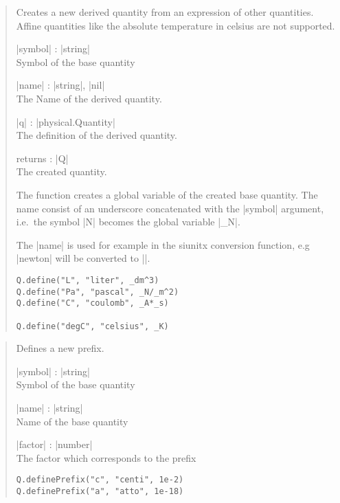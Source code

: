 \documentclass{ltxdoc}
\begin{document}
\begin{quote}
  Creates a new derived quantity from an expression of other quantities. Affine quantities like the absolute temperature in celsius are not supported.

  \begin{description}
  \item |symbol| : |string|\\
  Symbol of the base quantity

  \item |name| : |string|, |nil|\\
    The Name of the derived quantity.

  \item |q| : |physical.Quantity|\\
    The definition of the derived quantity.

  \item returns : |Q|\\
    The created quantity.
  \end{description}

  The function creates a global variable of the created base quantity. The name consist of an underscore concatenated with the |symbol| argument, i.e.\ the symbol |N| becomes the global variable |_N|.

  The |name| is used for example in the siunitx conversion function, e.g |newton| will be converted to |\newton|.

  \begin{lstlisting}
Q.define("L", "liter", _dm^3)
Q.define("Pa", "pascal", _N/_m^2)
Q.define("C", "coulomb", _A*_s)

Q.define("degC", "celsius", _K)
  \end{lstlisting}
\end{quote}




\begin{quote}
  Defines a new prefix.

  \begin{description}
  \item |symbol| : |string|\\
    Symbol of the base quantity

  \item |name| : |string|\\
    Name of the base quantity

  \item |factor| : |number|\\
    The factor which corresponds to the prefix
  \end{description}


\begin{lstlisting}
Q.definePrefix("c", "centi", 1e-2)
Q.definePrefix("a", "atto", 1e-18)
\end{lstlisting}
\end{quote}
\end{document}
